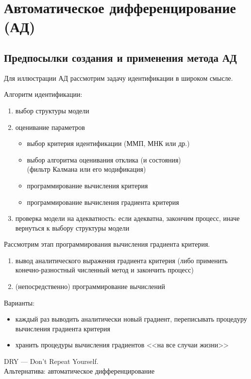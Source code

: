 \documentclass{beamer}
\begin{document}
\section{Автоматическое дифференцирование (АД)}

\subsection{Предпосылки создания и применения метода АД}

\begin{frame}{\secname}{\subsecname}
	Для иллюстрации АД рассмотрим задачу идентификации в широком смысле. \\
	\pause

  Алгоритм идентификации: \pause
  \begin{enumerate}
	\item выбор структуры модели \pause
	\item оценивание параметров \pause
	\begin{itemize}
	  \item выбор критерия идентификации (ММП, МНК или др.) \pause
	  \item выбор алгоритма оценивания отклика (и состояния) \pause\\(фильтр Калмана
		или его модификация) \pause
	  \item программирование вычисления критерия \pause
	  \item программирование вычисления градиента критерия \pause
	\end{itemize}
	\item проверка модели на адекватность: если адекватна, закончим процесс,
	  иначе вернуться к выбору структуры модели
  \end{enumerate}
  
\end{frame}

\begin{frame}{\secname}{\subsecname}
  Рассмотрим этап программирования вычисления градиента критерия. \pause
  \begin{enumerate}
	\item вывод аналитического выражения градиента критерия \pause (либо применить
	  конечно-разностный численный метод и закончить процесс) \pause
	\item (непосредственно) программирование вычислений
  \end{enumerate}
\end{frame}

\begin{frame}{\secname}{\subsecname}
  Варианты: \pause
  \begin{itemize}
	\item каждый раз выводить аналитически новый градиент, \pause переписывать
	процедуру вычисления градиента критерия \pause
  \item хранить процедуры вычисления градиентов <<на все случаи жизни>> \pause
  \end{itemize}
  DRY --- Don't Repeat Yourself. \\ \pause
  Альтернатива: автоматическое дифференцирование
\end{frame}
\end{document}
